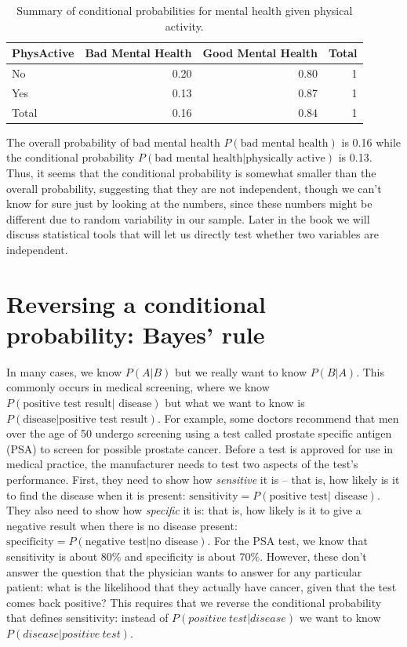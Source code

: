 \documentclass[
  12pt,
]{book}
\begin{document}
\begin{table}

\caption{\label{tab:condProb}Summary of conditional probabilities for mental health given physical activity.}
\centering
\begin{tabular}[t]{l|r|r|r}
\hline
PhysActive & Bad Mental Health & Good Mental Health & Total\\
\hline
No & 0.20 & 0.80 & 1\\
\hline
Yes & 0.13 & 0.87 & 1\\
\hline
Total & 0.16 & 0.84 & 1\\
\hline
\end{tabular}
\end{table}

The overall probability of bad mental health \(P(\text{bad mental health})\) is 0.16 while the conditional probability \(P(\text{bad mental health|physically active})\) is 0.13. Thus, it seems that the conditional probability is somewhat smaller than the overall probability, suggesting that they are not independent, though we can't know for sure just by looking at the numbers, since these numbers might be different due to random variability in our sample. Later in the book we will discuss statistical tools that will let us directly test whether two variables are independent.

\hypertarget{bayestheorem}{%
\section{Reversing a conditional probability: Bayes' rule}\label{bayestheorem}}

In many cases, we know \(P(A|B)\) but we really want to know \(P(B|A)\). This commonly occurs in medical screening, where we know \(P(\text{positive test result| disease})\) but what we want to know is \(P(\text{disease|positive test result})\). For example, some doctors recommend that men over the age of 50 undergo screening using a test called prostate specific antigen (PSA) to screen for possible prostate cancer. Before a test is approved for use in medical practice, the manufacturer needs to test two aspects of the test's performance. First, they need to show how \emph{sensitive} it is -- that is, how likely is it to find the disease when it is present: \(\text{sensitivity} = P(\text{positive test| disease})\). They also need to show how \emph{specific} it is: that is, how likely is it to give a negative result when there is no disease present: \(\text{specificity} = P(\text{negative test|no disease})\). For the PSA test, we know that sensitivity is about 80\% and specificity is about 70\%. However, these don't answer the question that the physician wants to answer for any particular patient: what is the likelihood that they actually have cancer, given that the test comes back positive? This requires that we reverse the conditional probability that defines sensitivity: instead of \(P(positive\ test| disease)\) we want to know \(P(disease|positive\ test)\).
\end{document}
